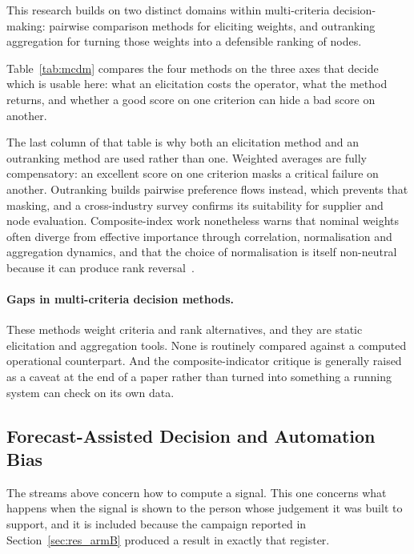 This research builds on two distinct domains within multi-criteria decision-making:
pairwise comparison methods for eliciting weights, and outranking aggregation for turning
those weights into a defensible ranking of nodes.

Table~\ref{tab:mcdm} compares the four methods on the three axes that decide which is usable
here: what an elicitation costs the operator, what the method returns, and whether a good
score on one criterion can hide a bad score on another.

The last column of that table is why both an elicitation method and an outranking method are
used rather than one. Weighted averages are fully compensatory: an excellent score on one
criterion masks a critical failure on another. Outranking builds pairwise preference flows
instead, which prevents that masking, and a cross-industry survey confirms its suitability for
supplier and node evaluation. Composite-index work nonetheless warns that nominal weights
often diverge from effective importance through correlation, normalisation and aggregation
dynamics, and that the choice of normalisation is itself non-neutral because it can produce
rank reversal~\autocite{greco2018,becker2017,triantaphyllou2000multi}.

\paragraph{Gaps in multi-criteria decision methods.}
These methods weight criteria and rank alternatives, and they are static elicitation and
aggregation tools. None is routinely compared against a computed operational counterpart. And
the composite-indicator critique is generally raised as a caveat at the end of a paper rather
than turned into something a running system can check on its own data.

\subsection{Forecast-Assisted Decision and Automation Bias}
\label{sec:lit_automation}

The streams above concern how to compute a signal. This one concerns what happens when the
signal is shown to the person whose judgement it was built to support, and it is included
because the campaign reported in Section~\ref{sec:res_armB} produced a result in exactly
that register.

